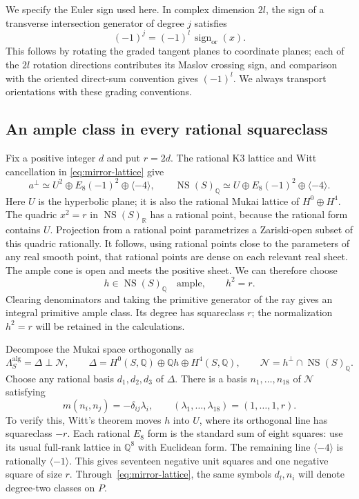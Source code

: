 \documentclass[11pt]{article}
\numberwithin{equation}{section}
\theoremstyle{definition}
\theoremstyle{remark}
\newcommand{\Q}{\mathbb Q}
\newcommand{\R}{\mathbb R}
\newcommand{\NS}{\operatorname{NS}}
\begin{document}
We specify the Euler sign used here.  In complex dimension $2l$, the sign of
a transverse intersection generator of degree $j$ satisfies
\begin{equation}\label{eq:euler-intersection-sign}
 (-1)^j=(-1)^l\,\operatorname{sign}_{\mathrm{or}}(x).
\end{equation}
This follows by rotating the graded tangent planes to coordinate planes;
each of the $2l$ rotation directions contributes its Maslov crossing sign,
and comparison with the oriented direct-sum convention gives $(-1)^l$.
We always transport orientations with these grading conventions.

\subsection{An ample class in every rational squareclass}

Fix a positive integer $d$ and put $r=2d$.  The rational K3 lattice and Witt cancellation in
\eqref{eq:mirror-lattice} give
\[
 a^\perp\simeq U^2\oplus E_8(-1)^2\oplus\langle-4\rangle,
 \qquad
 \NS(S)_\Q\simeq U\oplus E_8(-1)^2\oplus\langle-4\rangle.
\]
Here $U$ is the hyperbolic plane; it is also the rational Mukai lattice of
$H^0\oplus H^4$.  The quadric $x^2=r$ in $\NS(S)_\R$ has a rational point,
because the rational form contains $U$.  Projection from a rational point
parametrizes a Zariski-open subset of this quadric rationally.  It follows,
using rational points close to the parameters of any real smooth point,
that rational points are dense on each relevant real sheet.  The ample cone
is open and meets the positive sheet.  We can therefore choose
\[
 h\in\NS(S)_\Q\quad\text{ample},\qquad h^2=r.
\]
Clearing denominators and taking the primitive generator of the ray gives
an integral primitive ample class.  Its degree has squareclass $r$; the
normalization $h^2=r$ will be retained in the calculations.

Decompose the Mukai space orthogonally as
\begin{equation}\label{eq:delta-negative}
 \Lambda_S^{\mathrm{alg}}=\Delta\mathbin{\perp}\mathcal N,
 \qquad
 \Delta=H^0(S,\Q)\oplus\Q h\oplus H^4(S,\Q),\qquad
 \mathcal N=h^\perp\cap\NS(S)_\Q.
\end{equation}
Choose any rational basis $d_1,d_2,d_3$ of $\Delta$.  There is a basis
$n_1,\ldots,n_{18}$ of $\mathcal N$ satisfying
\begin{equation}\label{eq:negative-basis}
 m(n_i,n_j)=-\delta_{ij}\lambda_i,
 \qquad (\lambda_1,\ldots,\lambda_{18})=(1,\ldots,1,r).
\end{equation}
To verify this, Witt's theorem moves $h$ into $U$, where its orthogonal
line has squareclass $-r$.  Each rational $E_8$ form is the standard sum of
eight squares: use its usual full-rank lattice in $\Q^8$ with Euclidean
form.  The remaining line $\langle-4\rangle$ is rationally
$\langle-1\rangle$.  This gives seventeen negative unit squares and one
negative square of size $r$.  Through~\eqref{eq:mirror-lattice}, the same
symbols $d_l,n_i$ will denote degree-two classes on $P$.
\end{document}
